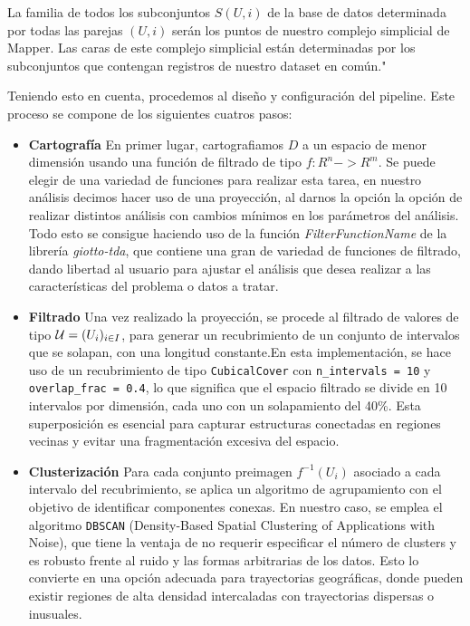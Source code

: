 La familia de todos los subconjuntos $S(U,i)$ de la base de datos determinada por todas las parejas $(U,i)$ serán los puntos de nuestro complejo simplicial de Mapper. Las caras de este complejo simplicial están determinadas por los subconjuntos que contengan registros de nuestro dataset en común."\   \cite{bourbaki_mapper}

\vspace{5cm}

Teniendo esto en cuenta, procedemos al diseño y configuración del pipeline. Este proceso se compone de los siguientes cuatros pasos:

\begin{itemize}
    \item \textbf{Cartografía} En primer lugar, cartografiamos $D$ a un espacio de menor dimensión usando una función de filtrado de tipo $f: R^n -> R^m$. Se puede elegir de una variedad de funciones para realizar esta tarea, en nuestro análisis decimos hacer uso de una proyección, al darnos la opción la opción de realizar distintos análisis con cambios mínimos en los parámetros del análisis. Todo esto se consigue haciendo uso de la función \textit{FilterFunctionName} de la librería \textit{giotto-tda}, que contiene una gran de variedad de funciones de filtrado, dando libertad al usuario para ajustar el análisis que desea realizar a las características del problema o datos a tratar.  
    \item \textbf{Filtrado} Una vez realizado la proyección, se procede al filtrado de valores de tipo ${\cal U } = (U_i)_ {i\in I}$, para generar un recubrimiento de un conjunto de intervalos que se solapan, con una longitud constante.En esta implementación, se hace uso de un recubrimiento de tipo \texttt{CubicalCover} con \texttt{n\_intervals = 10} y \texttt{overlap\_frac = 0.4}, lo que significa que el espacio filtrado se divide en 10 intervalos por dimensión, cada uno con un solapamiento del 40\%. Esta superposición es esencial para capturar estructuras conectadas en regiones vecinas y evitar una fragmentación excesiva del espacio.
    \item \textbf{Clusterización} Para cada conjunto preimagen $f^{-1}(U_i)$ asociado a cada intervalo del recubrimiento, se aplica un algoritmo de agrupamiento con el objetivo de identificar componentes conexas. En nuestro caso, se emplea el algoritmo \texttt{DBSCAN} (Density-Based Spatial Clustering of Applications with Noise), que tiene la ventaja de no requerir especificar el número de clusters y es robusto frente al ruido y las formas arbitrarias de los datos. Esto lo convierte en una opción adecuada para trayectorias geográficas, donde pueden existir regiones de alta densidad intercaladas con trayectorias dispersas o inusuales.


\end{itemize}
